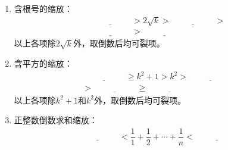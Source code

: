 \documentclass{article}
\newif\ifte
\renewcommand\geq\geqslant
\begin{document}
\begin{multicols}{2}
\begin{enumerate}[leftmargin=20pt]
\item 含根号的缩放：
\begin{gather*}
    \underline{\ \ifte \sqrt{k+1}+\sqrt{k}\else \hspace{2cm} \fi\ }
    >2\sqrt{k}>\underline{\ \ifte \sqrt{k+\dfrac{1}{2}}+
    \sqrt{k-\dfrac{1}{2}} \else \hspace{2cm} \fi\ }> \\
    \underline{\ \ifte \sqrt{k+1}+\sqrt{k-1}\else \hspace{2cm} \fi\ }
    >\underline{\ \ifte \sqrt{k}+\sqrt{k-1}\else \hspace{2cm} \fi\ }
\end{gather*}
以上各项除$ 2\sqrt{k} $外，取倒数后均可裂项。

\item 含平方的缩放：
\begin{gather*}
    \underline{\ \ifte k(k+1)\else \hspace{2cm} \fi\ }\geq k^2+1>k^2>
    \underline{\ \ifte \left( k-\dfrac{1}{2}\right)\left(k+
    \dfrac{1}{2}\right)\else \hspace{2cm} \fi\ } \\
    >\underline{\ \ifte (k-1)(k+1)\else \hspace{2cm} \fi\ } \geq
    \underline{\ \ifte k(k-1)\else \hspace{2cm} \fi\ }
\end{gather*}
以上各项除$ k^2+1 $和$ k^2 $外，取倒数后均可裂项。

\item 正整数倒数求和缩放：
\begin{gather*}
    \underline{\ \ifte \ln(n+1)\else \hspace{2cm} \fi\ }
    <\dfrac{1}{1}+\dfrac{1}{2}+\cdots +\dfrac{1}{n}
    <\underline{\ \ifte 1+\ln n\else \hspace{2cm} \fi\ }
\end{gather*}


\end{enumerate}
\end{multicols}
\end{document}
